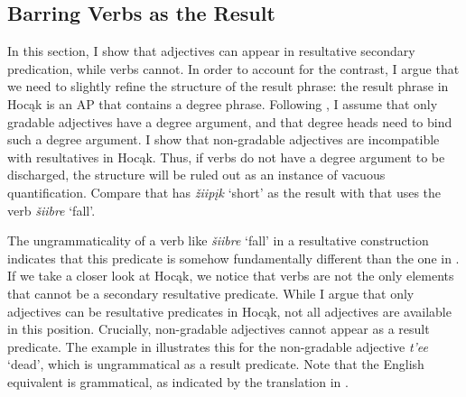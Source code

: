 \documentclass[output=paper]{LSP/langsci}
\begin{document}
\subsection{Barring Verbs as the Result}

In this section, I show that adjectives can appear in resultative secondary predication, while verbs cannot. In order to account for the contrast, I argue that we need to slightly refine the structure of the result phrase: the result phrase in Hocąk is an AP that contains a degree phrase. Following \citet{Cover1997}, I assume that only gradable adjectives have a degree argument, and that degree heads need to bind such a degree argument. I show that non-gradable adjectives are incompatible with resultatives in Hocąk. Thus, if verbs do not have a degree argument to be discharged, the structure will be ruled out as an instance of vacuous quantification. Compare  that has \textit{žiipįk} `short' as the result with  that uses the verb \textit{šiibre} `fall'.

\begin{exe}



\end{exe}

The ungrammaticality of a verb like \textit{šiibre} `fall' in a resultative construction  indicates that this predicate is somehow fundamentally different than the one in . If we take a closer look at Hocąk, we notice that verbs are not the only elements that cannot be a secondary resultative predicate. While I argue that only adjectives can be resultative predicates in Hocąk, not all adjectives are available in this position. Crucially, non-gradable adjectives cannot appear as a result predicate. The example in  illustrates this for the non-gradable adjective \textit{t'ee} `dead', which is ungrammatical as a result predicate. Note that the English equivalent is grammatical, as indicated by the translation in .
\end{document}
